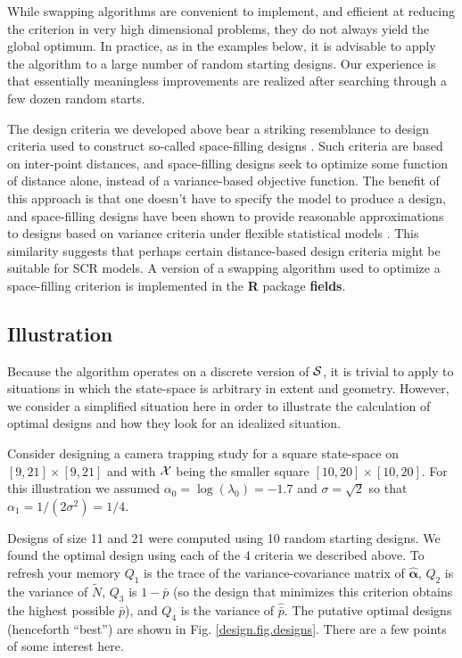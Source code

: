 While swapping algorithms are convenient to implement, and efficient
at reducing the criterion in very high dimensional problems, they do
not always yield the global optimum.  In practice, as in the examples
below, it is advisable to apply the algorithm to a large number of
random starting designs.  Our experience is that essentially
meaningless improvements are realized after searching through a few
dozen random starts.

The design criteria we developed above bear a striking resemblance
to design criteria used to construct so-called space-filling designs
\citep{nychka_etal:1997}. Such criteria are based on inter-point
distances, and space-filling designs seek to optimize some function of
distance alone, instead of a variance-based objective function. The
benefit of this approach is that one doesn't have to specify the model
to produce a design, and space-filling designs have been shown to
provide reasonable approximations to designs based on variance
criteria under flexible
statistical models \citep{nychka_etal:1997}. 
This similarity suggests that perhaps
certain distance-based design criteria might be suitable for SCR
models. A version of a swapping algorithm used to
optimize a space-filling criterion is implemented in the {\bf R}
package {\bf fields}.


\subsection{Illustration}

Because the algorithm operates on a discrete version of ${\cal S}$,
it is trivial to apply to situations in which the
state-space is arbitrary in extent and geometry. However, we consider
a simplified situation here in order to illustrate the calculation of
optimal designs and how they look for an idealized situation.

Consider designing a camera trapping study for a square state-space on
$[9,21] \times [9, 21]$ and with ${\cal X}$ being the smaller square
$[10,20] \times [10,20]$.  For this illustration we assumed
$\alpha_{0} = \log(\lambda_{0}) = -1.7$ and $\sigma=\sqrt{2}$ so that
$\alpha_{1} = 1/(2\sigma^{2}) = 1/4$.

Designs of size 11 and 21 were computed using 10 random starting
designs.  We found the optimal design using each of the 4 criteria we
described above. To refresh your memory $Q_{1}$ is the trace of the
variance-covariance matrix of $\hat{\bm \alpha}$, $Q_{2}$ is the
variance of $\tilde{N}$, $Q_{3}$ is $1-\bar{p}$ (so the design that
minimizes this criterion obtains the highest possible $\bar{p}$), and
$Q_{4}$ is the variance of $\hat{\bar{p}}$.  The putative optimal
designs (henceforth ``best'') are shown in
Fig. \ref{design.fig.designs}. There are a few points of some interest
here.


